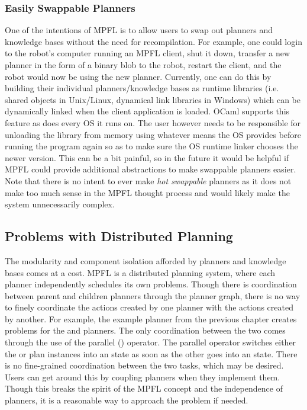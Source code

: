 \subsubsection{Easily Swappable Planners}
One of the intentions of MPFL is to allow users to swap out planners and knowledge bases without the need for recompilation. For example, one could login to the robot's computer running an MPFL client, shut it down, transfer a new planner in the form of a binary blob to the robot, restart the client, and the robot would now be using the new planner. Currently, one can do this by building their individual planners/knowledge bases as runtime libraries (i.e. shared objects in Unix/Linux, dynamical link libraries in Windows) which can be dynamically linked when the client application is loaded. OCaml supports this feature as does every OS it runs on. The user however needs to be responsible for unloading the library from memory using whatever means the OS provides before running the program again so as to make sure the OS runtime linker chooses the newer version. This can be a bit painful, so in the future it would be helpful if MPFL could provide additional abstractions to make swappable planners easier. Note that there is no intent to ever make \emph{hot swappable} planners as it does not make too much sense in the MPFL thought process and would likely make the system unnecessarily complex.

\subsection{Problems with Distributed Planning}
The modularity and component isolation afforded by planners and knowledge bases comes at a cost. MPFL is a distributed planning system, where each planner independently schedules its own problems. Though there is coordination between parent and children planners through the planner graph, there is no way to finely coordinate the actions created by one planner with the actions created by another. For example, the example  planner from the previous chapter creates problems for the  and  planners. The only coordination between the two comes through the use of the parallel (\Code{||}) operator. The parallel operator switches either the  or  plan instances into an  state as soon as the other goes into an  state. There is no fine-grained coordination between the two tasks, which may be desired. Users can get around this by coupling planners when they implement them. Though this breaks the spirit of the MPFL concept and the independence of planners, it is a reasonable way to approach the problem if needed.

